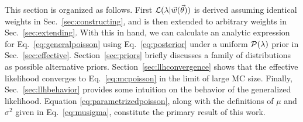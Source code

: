 This section is organized as follows.
First $\mathcal{L}(\lambda|\vec{w}(\vec{\theta}))$ is derived assuming identical weights in Sec.~\ref{sec:constructing}, and is then extended to arbitrary weights in Sec.~\ref{sec:extending}.
With this in hand, we can calculate an analytic expression for Eq.~\eqref{eq:generalpoisson} using Eq.~\eqref{eq:posterior} under a uniform $\mathcal{P}(\lambda)$ prior in Sec.~\ref{sec:effective}.
Section~\ref{sec:priors} briefly discusses a family of distributions as possible alternative priors.
Section~\ref{sec:llhconvergence} shows that the effective likelihood converges to Eq.~\eqref{eq:mcpoisson} in the limit of large MC size.
Finally, Sec.~\ref{sec:llhbehavior} provides some intuition on the behavior of the generalized likelihood.
Equation \eqref{eq:parametrizedpoisson}, along with the definitions of $\mu$ and $\sigma^2$ given in Eq.~\eqref{eq:musigma}, constitute the primary result of this work.
